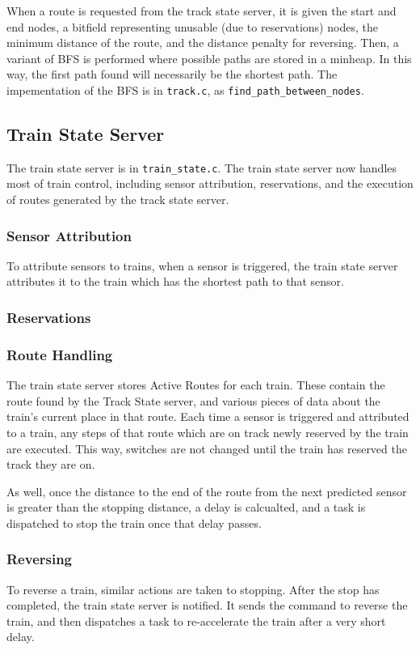 \documentclass{article}
\begin{document}
When a route is requested from the track state server, it is given the start and end nodes, a bitfield representing unusable (due to reservations) nodes, the minimum distance of the route, and the distance penalty for reversing. Then, a variant of BFS is performed where possible paths are stored in a minheap. In this way, the first path found will necessarily be the shortest path. 
The impementation of the BFS is in \verb|track.c|, as \verb|find_path_between_nodes|.

\subsection{ Train State Server}
The train state server is in \verb|train_state.c|.
The train state server now handles most of train control, including sensor attribution, reservations, and the execution of routes generated by the track state server.
\subsubsection{ Sensor Attribution}
To attribute sensors to trains, when a sensor is triggered, the train state server attributes it to the train which has the shortest path to that sensor.
\subsubsection{ Reservations}
\subsubsection{ Route Handling}
The train state server stores Active Routes for each train. These contain the route found by the Track State server, and various pieces of data about the train's current place in that route.
Each time a sensor is triggered and attributed to a train, any steps of that route which are on track newly reserved by the train are executed. This way, switches are not changed until the train has reserved the track they are on.

As well, once the distance to the end of the route from the next predicted sensor is greater than the stopping distance, a delay is calcualted, and a task is dispatched to stop the train once that delay passes.
\subsubsection{ Reversing}
To reverse a train, similar actions are taken to stopping. After the stop has completed, the train state server is notified. It sends the command to reverse the train, and then dispatches a task to re-accelerate the train after a very short delay.
\end{document}
